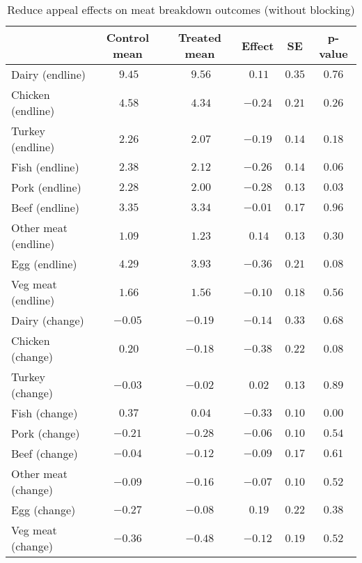 \begin{table*}[ht]
\caption{Reduce appeal effects on meat breakdown outcomes (without blocking)\label{round}} 
\begin{center}
\begin{tabular}{lccccc}
\hline\hline
\multicolumn{1}{l}{}&\multicolumn{1}{c}{Control mean}&\multicolumn{1}{c}{Treated mean}&\multicolumn{1}{c}{Effect}&\multicolumn{1}{c}{SE}&\multicolumn{1}{c}{p-value}\tabularnewline
\hline
Dairy (endline)&$~9.45$&$~9.56$&$~0.11$&$0.35$&$0.76$\tabularnewline
Chicken (endline)&$~4.58$&$~4.34$&$-0.24$&$0.21$&$0.26$\tabularnewline
Turkey (endline)&$~2.26$&$~2.07$&$-0.19$&$0.14$&$0.18$\tabularnewline
Fish (endline)&$~2.38$&$~2.12$&$-0.26$&$0.14$&$0.06$\tabularnewline
Pork (endline)&$~2.28$&$~2.00$&$-0.28$&$0.13$&$0.03$\tabularnewline
Beef (endline)&$~3.35$&$~3.34$&$-0.01$&$0.17$&$0.96$\tabularnewline
Other meat (endline)&$~1.09$&$~1.23$&$~0.14$&$0.13$&$0.30$\tabularnewline
Egg (endline)&$~4.29$&$~3.93$&$-0.36$&$0.21$&$0.08$\tabularnewline
Veg meat (endline)&$~1.66$&$~1.56$&$-0.10$&$0.18$&$0.56$\tabularnewline
Dairy (change)&$-0.05$&$-0.19$&$-0.14$&$0.33$&$0.68$\tabularnewline
Chicken (change)&$~0.20$&$-0.18$&$-0.38$&$0.22$&$0.08$\tabularnewline
Turkey (change)&$-0.03$&$-0.02$&$~0.02$&$0.13$&$0.89$\tabularnewline
Fish (change)&$~0.37$&$~0.04$&$-0.33$&$0.10$&$0.00$\tabularnewline
Pork (change)&$-0.21$&$-0.28$&$-0.06$&$0.10$&$0.54$\tabularnewline
Beef (change)&$-0.04$&$-0.12$&$-0.09$&$0.17$&$0.61$\tabularnewline
Other meat (change)&$-0.09$&$-0.16$&$-0.07$&$0.10$&$0.52$\tabularnewline
Egg (change)&$-0.27$&$-0.08$&$~0.19$&$0.22$&$0.38$\tabularnewline
Veg meat (change)&$-0.36$&$-0.48$&$-0.12$&$0.19$&$0.52$\tabularnewline
\hline
\end{tabular}\end{center}

\end{table*}
